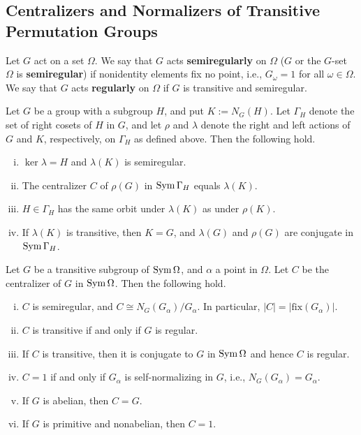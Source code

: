 \subsection{Centralizers and Normalizers of Transitive Permutation Groups}
\begin{definition}
	Let $G$ act on a set $\Omega$. We say that $G$ acts \textbf{semiregularly} on $\Omega$ ($G$ or the $G$-set $\Omega$ is \textbf{semiregular}) if nonidentity elements fix no point, i.e., $G_\omega = 1$ for all $\omega\in\Omega$. We say that $G$ acts \textbf{regularly} on $\Omega$ if $G$ is transitive and semiregular.
\end{definition}
\begin{lemma}
	Let $G$ be a group with a subgroup $H$, and put $K := N_G(H)$. Let $\Gamma_H$ denote the set of right cosets of $H$ in $G$, and let $\rho$ and $\lambda$ denote the right and left actions of $G$ and $K$, respectively, on $\Gamma_H$ as defined above. Then the following hold.
\begin{enumerate}[(i)]
\item $\ker \lambda = H$ and $\lambda(K)$ is semiregular.
\item The centralizer $C$ of $\rho(G)$ in $\operatorname{Sym}\Gamma_H$ equals $\lambda(K)$.
\item $H \in \Gamma_H$ has the same orbit under $\lambda(K)$ as under $\rho(K)$.
\item If $\lambda(K)$ is transitive, then $K = G$, and $\lambda(G)$ and $\rho(G)$ are conjugate in $\operatorname{Sym}\Gamma_H$.
\end{enumerate}
\end{lemma}
\begin{sketch}
	
\end{sketch}

\begin{theorem}
	Let $G$ be a transitive subgroup of $\operatorname{Sym}\Omega$, and $\alpha$ a point in $\Omega$. Let $C$ be the centralizer of $G$ in $\operatorname{Sym}\Omega$. Then the following hold.
	\begin{enumerate}[(i)]
		\item $C$ is semiregular, and $C \cong N_G(G_\alpha)/G_\alpha$. In particular, $|C| = |\text{fix}(G_\alpha)|$.
		\item $C$ is transitive if and only if $G$ is regular.
		\item If $C$ is transitive, then it is conjugate to $G$ in $\operatorname{Sym}\Omega$ and hence $C$ is regular.
		\item $C = 1$ if and only if $G_\alpha$ is self-normalizing in $G$, i.e., $N_G(G_\alpha) = G_\alpha$.
		\item If $G$ is abelian, then $C = G$.
		\item If $G$ is primitive and nonabelian, then $C = 1$.
	\end{enumerate}
\end{theorem}
\begin{sketch}
	
\end{sketch}


